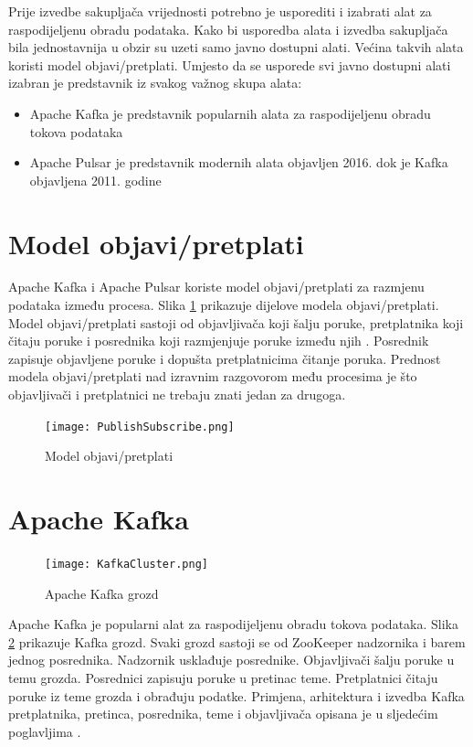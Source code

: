 \documentclass[utf8, diplomski, lmodern, numeric]{fer}
\begin{document}
Prije izvedbe sakupljača vrijednosti potrebno je usporediti i izabrati alat za raspodijeljenu obradu podataka. Kako bi usporedba alata i izvedba sakupljača bila jednostavnija u obzir su uzeti samo javno dostupni alati. Većina takvih alata koristi model objavi/pretplati. Umjesto da se usporede svi javno dostupni alati izabran je predstavnik iz svakog važnog skupa alata:
\begin{itemize}
    \item Apache Kafka je predstavnik popularnih alata za raspodijeljenu obradu tokova podataka
    \item Apache Pulsar \citep{yahoo-blogpost} je predstavnik modernih alata objavljen 2016. dok je Kafka \citep{kafka-whitepaper} objavljena 2011. godine
\end{itemize}


\section{Model objavi/pretplati}

Apache Kafka i Apache Pulsar koriste model objavi/pretplati  za razmjenu podataka između procesa. Slika \ref{fig:publish-subscribe} prikazuje dijelove modela objavi/pretplati. Model objavi/pretplati sastoji od objavljivača  koji šalju poruke, pretplatnika  koji čitaju poruke i posrednika  koji razmjenjuje poruke između njih \citep{rassus-manual}. Posrednik zapisuje objavljene poruke i dopušta pretplatnicima čitanje poruka. Prednost modela objavi/pretplati nad izravnim razgovorom među procesima je što objavljivači i pretplatnici ne trebaju znati jedan za drugoga.

\begin{figure}[H]
    \centering
    \texttt{[image: PublishSubscribe.png]}
    \caption{Model objavi/pretplati}
    \label{fig:publish-subscribe}
\end{figure}


\section{Apache Kafka}

\begin{figure}[H]
    \centering
    \texttt{[image: KafkaCluster.png]}
    \caption{Apache Kafka grozd}
    \label{fig:kafka-cluster}
\end{figure}

Apache Kafka je popularni alat za raspodijeljenu obradu tokova podataka. Slika \ref{fig:kafka-cluster} prikazuje Kafka grozd. Svaki grozd sastoji se od ZooKeeper nadzornika i barem jednog posrednika. Nadzornik usklađuje posrednike. Objavljivači šalju poruke u temu grozda. Posrednici zapisuju poruke u pretinac teme. Pretplatnici čitaju poruke iz teme grozda i obrađuju podatke. Primjena, arhitektura i izvedba Kafka pretplatnika, pretinca, posrednika, teme i objavljivača opisana je u sljedećim poglavljima \citep{kafka-whitepaper} \citep{kafka-docs}.
\end{document}
